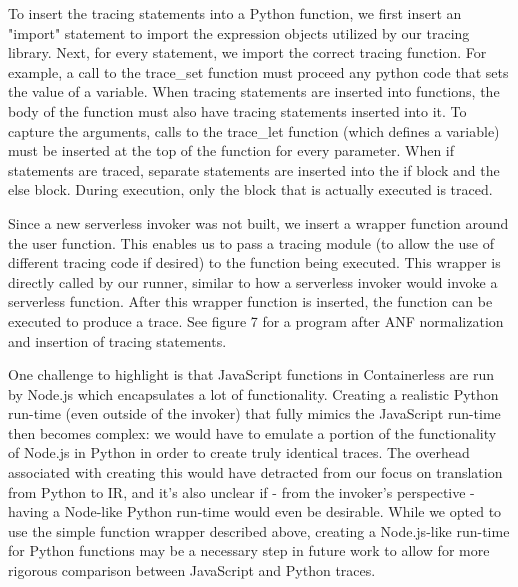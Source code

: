 \documentclass[acmsmall,review,authorversion]{acmart}
\begin{document}
To insert the tracing statements into a Python function, we first insert an "import" statement to import the expression objects utilized by our tracing library. Next, for every statement, we import the correct tracing function. For example, a call to the trace\_set function must proceed any python code that sets the value of a variable. When tracing statements are inserted into functions, the body of the function must also have tracing statements inserted into it. To capture the arguments, calls to the trace\_let function (which defines a variable) must be inserted at the top of the function for every parameter. When if statements are traced, separate statements are inserted into the if block and the else block. During execution, only the block that is actually executed is traced.
\par
Since a new serverless invoker was not built, we insert a wrapper function around the user function. This enables us to pass a tracing module (to allow the use of different tracing code if desired) to the function being executed. This wrapper is directly called by our runner, similar to how a serverless invoker would invoke a serverless function. After this wrapper function is inserted, the function can be executed to produce a trace. See figure 7 for a program after ANF normalization and insertion of tracing statements.
\par
One challenge to highlight is that JavaScript functions in Containerless are run by Node.js which encapsulates a lot of functionality. Creating a realistic Python run-time (even outside of the invoker) that fully mimics the JavaScript run-time then becomes complex: we would have to emulate a portion of the functionality of Node.js in Python in order to create truly identical traces. The overhead associated with creating this would have detracted from our focus on translation from Python to IR, and it's also unclear if - from the invoker's perspective - having a Node-like Python run-time would even be desirable. While we opted to use the simple function wrapper described above, creating a Node.js-like run-time for Python functions may be a necessary step in future work to allow for more rigorous comparison between JavaScript and Python traces.


\end{document}
